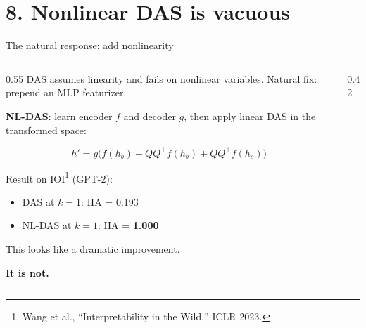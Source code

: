 \documentclass[aspectratio=169,11pt]{beamer}
\begin{document}
\section{8. Nonlinear DAS is vacuous}

\begin{frame}{The natural response: add nonlinearity}

\begin{columns}[T]
\begin{column}{0.55\textwidth}
{\small DAS assumes linearity and fails on nonlinear variables. Natural fix: prepend an MLP featurizer.}

\vspace{0.3em}
{\small \textbf{NL-DAS}: learn encoder $f$ and decoder $g$, then apply linear DAS in the transformed space:}

$$h' = g\bigl(f(h_b) - QQ^\top f(h_b) + QQ^\top f(h_s)\bigr)$$

\vspace{0.3em}
{\small Result on IOI\footnote{\tiny Wang et al., ``Interpretability in the Wild,'' ICLR 2023.} (GPT-2):}
\begin{itemize}
  \item {\small DAS at $k=1$: IIA = 0.193}
  \item {\small NL-DAS at $k=1$: IIA = \textbf{1.000}}
\end{itemize}

\vspace{0.3em}
{\small This looks like a dramatic improvement.}

\vspace{0.3em}
{\normalsize \textbf{It is not.}}
\end{column}
\begin{column}{0.42\textwidth}
\end{column}
\end{columns}
\end{frame}
\end{document}
